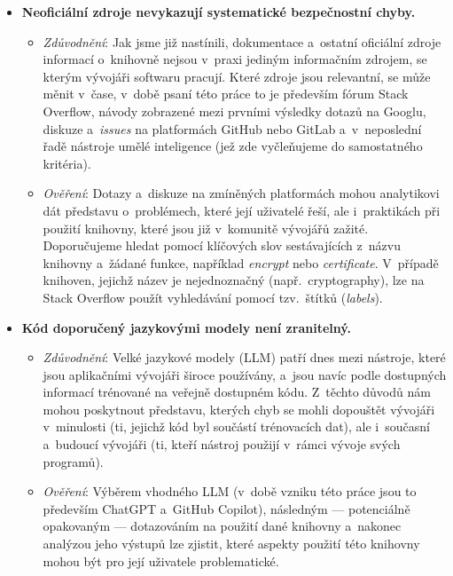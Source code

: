 \begin{itemize}
    \item \textbf{Neoficiální zdroje nevykazují systematické bezpečnostní chyby.} 
    \begin{itemize}[beginpenalty=10000]
        \item \textit{Zdůvodnění}: Jak jsme již nastínili, dokumentace a~ostatní oficiální zdroje informací o~knihovně nejsou v~praxi jediným informačním zdrojem, se kterým vývojáři softwaru pracují. Které zdroje jsou relevantní, se může měnit v~čase, v~době psaní této práce to je především fórum Stack Overflow, návody zobrazené mezi prvními výsledky dotazů na Googlu, diskuze a~\textit{issues} na platformách GitHub nebo GitLab a~v~neposlední řadě nástroje umělé inteligence (jež zde vyčleňujeme do samostatného kritéria).

        \item \textit{Ověření}: Dotazy a~diskuze na zmíněných platformách mohou analytikovi dát představu o~problémech, které její uživatelé řeší, ale i~praktikách při použití knihovny, které jsou již v~komunitě vývojářů zažité. Doporučujeme hledat pomocí klíčových slov sestávajících z~názvu knihovny a~žádané funkce, například \textit{encrypt} nebo \textit{certificate}. V~případě knihoven, jejichž název je nejednoznačný (např.\ cryptography), lze na Stack Overflow použít vyhledávání pomocí tzv.~štítků (\textit{labels}).
    \end{itemize}

    \item \textbf{Kód doporučený jazykovými modely není zranitelný.} 
    \begin{itemize}[beginpenalty=10000]
        \item \textit{Zdůvodnění}: Velké jazykové modely (LLM) patří dnes mezi nástroje, které jsou aplikačními vývojáři široce používány, a~jsou navíc podle dostupných informací trénované na veřejně dostupném kódu. Z~těchto důvodů nám mohou poskytnout představu, kterých chyb se mohli dopouštět vývojáři v~minulosti (ti, jejichž kód byl součástí trénovacích dat), ale i~současní a~budoucí vývojáři (ti, kteří nástroj použijí v~rámci vývoje svých programů).

        \item \textit{Ověření}: Výběrem vhodného LLM (v~době vzniku této práce jsou to především ChatGPT a~GitHub Copilot), následným --- potenciálně opakovaným --- dotazováním na použití dané knihovny a~nakonec analýzou jeho výstupů lze zjistit, které aspekty použití této knihovny mohou být pro její uživatele problematické.
    \end{itemize}
\end{itemize}

